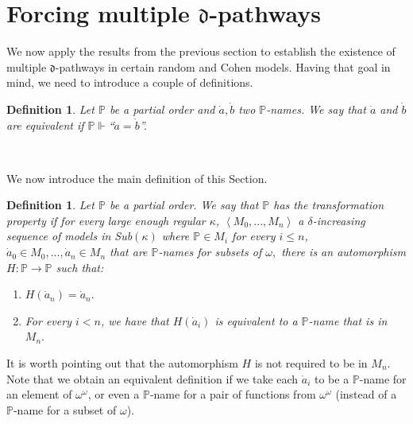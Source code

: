 \documentclass{article}%
\newtheorem{definition}[theorem]{Definition}
\begin{document}
\section{Forcing multiple $\mathfrak{d}$-pathways \label{forzando pathways}}

We now apply the results from the previous section to establish the existence
of multiple $\mathfrak{d}$-pathways in certain random and Cohen models. Having
that goal in mind, we need to introduce a couple of definitions.

\begin{definition}
Let $\mathbb{P}$ be a partial order and $\dot{a},\dot{b}$ two $\mathbb{P}%
$-names. We say that $\dot{a}$ and $\dot{b}$ \emph{are equivalent }if
$\mathbb{P}\Vdash$\textquotedblleft$\dot{a}=\dot{b}$\textquotedblright.
\end{definition}

\qquad\qquad\qquad\ \ \ 

We now introduce the main definition of this Section.

\begin{definition}
Let $\mathbb{P}$ be a partial order. We say that $\mathbb{P}$ \emph{has the
transformation property }if for every large enough regular $\kappa$,
$\left\langle M_{0},...,M_{n}\right\rangle $ a $\delta$-increasing sequence of
models in \textsf{Sub}$\left(  \kappa\right)  $ where $\mathbb{P}\in M_{i}$
for every $i\leq n$, $\dot{a}_{0}\in M_{0},...,\dot{a}_{n}\in M_{n}$ that are
$\mathbb{P}$-names for subsets of $\omega,$ there is an automorphism
$H:\mathbb{P\longrightarrow P}$ such that:

\begin{enumerate}
\item $H\left(  \dot{a}_{n}\right)  =\dot{a}_{n}.$

\item For every $i<n$, we have that $H(\dot{a}_{i})$ is equivalent to a
$\mathbb{P}$-name that is in $M_{n}.$
\end{enumerate}
\end{definition}

It is worth pointing out that the automorphism $H$ is not required to be in
$M_{n}.$ Note that we obtain an equivalent definition if we take each $\dot
{a}_{i}$ to be a $\mathbb{P}$-name for an element of $\omega^{\omega}$, or
even a $\mathbb{P}$-name for a pair of functions from $\omega^{\omega}$
(instead of a $\mathbb{P}$-name for a subset of $\omega$).

\qquad\ \qquad\ \ \ \ \ \ \ \ \qquad\ \ \ 
\end{document}
